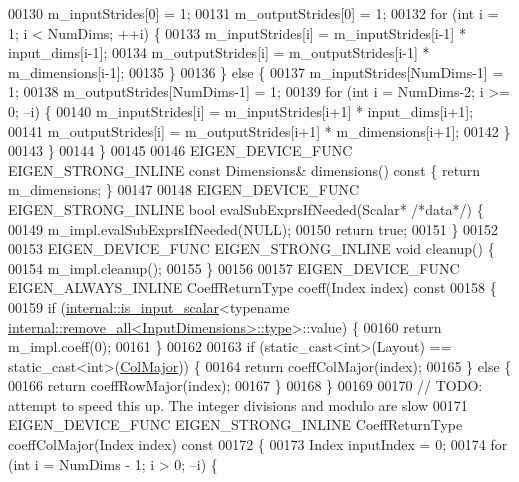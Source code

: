 \begin{DoxyCode}
00130       m\_inputStrides[0] = 1;
00131       m\_outputStrides[0] = 1;
00132       \textcolor{keywordflow}{for} (\textcolor{keywordtype}{int} i = 1; i < NumDims; ++i) \{
00133         m\_inputStrides[i] = m\_inputStrides[i-1] * input\_dims[i-1];
00134         m\_outputStrides[i] = m\_outputStrides[i-1] * m\_dimensions[i-1];
00135       \}
00136     \} \textcolor{keywordflow}{else} \{
00137       m\_inputStrides[NumDims-1] = 1;
00138       m\_outputStrides[NumDims-1] = 1;
00139       \textcolor{keywordflow}{for} (\textcolor{keywordtype}{int} i = NumDims-2; i >= 0; --i) \{
00140         m\_inputStrides[i] = m\_inputStrides[i+1] * input\_dims[i+1];
00141         m\_outputStrides[i] = m\_outputStrides[i+1] * m\_dimensions[i+1];
00142       \}
00143     \}
00144   \}
00145 
00146   EIGEN\_DEVICE\_FUNC EIGEN\_STRONG\_INLINE \textcolor{keyword}{const} Dimensions& dimensions()\textcolor{keyword}{ const }\{ \textcolor{keywordflow}{return} m\_dimensions; \}
00147 
00148   EIGEN\_DEVICE\_FUNC EIGEN\_STRONG\_INLINE \textcolor{keywordtype}{bool} evalSubExprsIfNeeded(Scalar* \textcolor{comment}{/*data*/}) \{
00149     m\_impl.evalSubExprsIfNeeded(NULL);
00150     \textcolor{keywordflow}{return} \textcolor{keyword}{true};
00151   \}
00152 
00153   EIGEN\_DEVICE\_FUNC EIGEN\_STRONG\_INLINE \textcolor{keywordtype}{void} cleanup() \{
00154     m\_impl.cleanup();
00155   \}
00156 
00157   EIGEN\_DEVICE\_FUNC EIGEN\_ALWAYS\_INLINE CoeffReturnType coeff(Index index)\textcolor{keyword}{ const}
00158 \textcolor{keyword}{  }\{
00159     \textcolor{keywordflow}{if} (\hyperlink{struct_eigen_1_1internal_1_1is__input__scalar}{internal::is\_input\_scalar}<\textcolor{keyword}{typename} 
      \hyperlink{group___sparse_core___module}{internal::remove\_all<InputDimensions>::type}>::value) \{
00160       \textcolor{keywordflow}{return} m\_impl.coeff(0);
00161     \}
00162 
00163     \textcolor{keywordflow}{if} (static\_cast<int>(Layout) == static\_cast<int>(\hyperlink{group__enums_ggaacded1a18ae58b0f554751f6cdf9eb13a0cbd4bdd0abcfc0224c5fcb5e4f6669a}{ColMajor})) \{
00164       \textcolor{keywordflow}{return} coeffColMajor(index);
00165     \} \textcolor{keywordflow}{else} \{
00166       \textcolor{keywordflow}{return} coeffRowMajor(index);
00167     \}
00168   \}
00169 
00170   \textcolor{comment}{// TODO: attempt to speed this up. The integer divisions and modulo are slow}
00171   EIGEN\_DEVICE\_FUNC EIGEN\_STRONG\_INLINE CoeffReturnType coeffColMajor(Index index)\textcolor{keyword}{ const}
00172 \textcolor{keyword}{  }\{
00173     Index inputIndex = 0;
00174     \textcolor{keywordflow}{for} (\textcolor{keywordtype}{int} i = NumDims - 1; i > 0; --i) \{

\end{DoxyCode}

